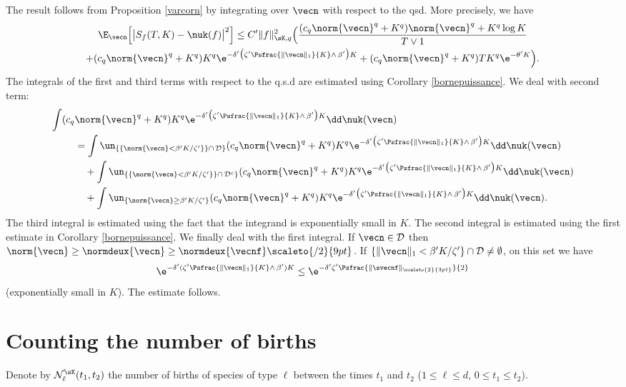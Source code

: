 The result follows from Proposition \ref{varcorn} by integrating over $\vecn$ with respect to the qsd.
More precisely, we have
\begin{multline*}
\E_{\vecn}\Bigl[\big|S_{f}(T,K)-\nuk(f)\big|^2\Bigr]\leq
C'\|f\|_{\sK,q}^2 \Bigl(\frac{(c_q\norm{\vecn}^{q} +K^q) \norm{\vecn}^{q} +K^q \log K}{T\vee 1}\\
+(c_q\norm{\vecn}^{q} +K^q) K^q \e^{-\delta'\bigl(\zeta' \Psfrac{\|\vecn\|_{1}}{K}\wedge\, \beta'\bigr)K}
+ (c_q\norm{\vecn}^{q} +K^q)T K^q \e^{-\theta'K}
\Bigr).
\end{multline*}
The integrals of the first and third terms with respect to the q.s.d are estimated using Corollary \ref{bornepuissance}.
We deal with second term:
\begin{align*}
\int (c_q&\norm{\vecn}^{q} +K^q) K^q \e^{-\delta'\bigl(\zeta' \Psfrac{\|\vecn\|_{1}}{K}\wedge\, \beta'\bigr)K} \dd\nuk(\vecn)\\
&
=\int \un_{\{\{\norm{\vecn} < \beta'K/\zeta'\}\}\cap\, \mathcal{D}\}} (c_q\norm{\vecn}^{q} +K^q) K^q
\e^{-\delta'\bigl(\zeta' \Psfrac{\|\vecn\|_{1}}{K}\wedge\, \beta'\bigr)K} \dd\nuk(\vecn)\\
& \quad+
\int \un_{\{\{\norm{\vecn} < \beta'K/\zeta'\}\}\cap\, \mathcal{D}^c\}} (c_q\norm{\vecn}^{q} +K^q) K^q
\e^{-\delta'\bigl(\zeta' \Psfrac{\|\vecn\|_{1}}{K}\wedge\, \beta'\bigr)K} \dd\nuk(\vecn)\\
& \quad+
\int \un_{\{\norm{\vecn} \geq \beta'K/\zeta'\}} (c_q\norm{\vecn}^{q} +K^q) K^q
\e^{-\delta'\bigl(\zeta' \Psfrac{\|\vecn\|_{1}}{K}\wedge\, \beta'\bigr)K} \dd\nuk(\vecn).
\end{align*}
The third integral is estimated using the fact that the integrand is exponentially small in $K$.
The second integral is estimated using the first estimate in Corollary \ref{bornepuissance}.
We finally deal with the first integral. If $\vecn\in \mathcal{D}$ then
$\norm{\vecn}\geq \normdeux{\vecn}\geq \normdeux{\vecnf}\scaleto{/2}{9pt}$.
If $\{\|\vecn\|_1 < \beta'K/\zeta'\}\cap \mathcal{D} \neq \emptyset$, on this set we have
\[
\e^{-\delta'(\zeta' \Psfrac{\|\vecn\|_{1}}{K}\wedge\, \beta')K}\leq \e^{-\delta'\zeta' \Psfrac{\|\svecnf\|_{\scaleto{2}{3pt}}}{2}}
\]
(exponentially small in $K$). The estimate follows.

\section{Counting the number of births}\label{nbsauts}

Denote by $\mathcal{N}^{\sK}_\ell(t_{1},t_{2})$ the number of births of species of type $\ell$ between the times $t_{1}$ and $t_{2}$ ($1\leq \ell \leq d$, $0\leq t_1\leq t_2$).

